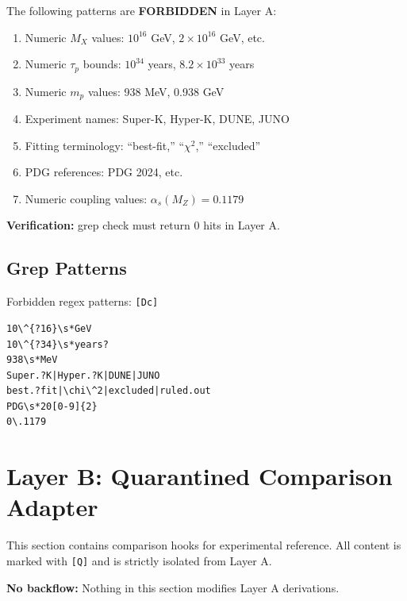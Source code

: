 \documentclass[11pt,a4paper]{article}
\newcommand{\tagDc}{\textcolor{blue!70!black}{\texttt{[Dc]}}}
\newcommand{\tagQ}{\textcolor{red!70!black}{\texttt{[Q]}}}
\theoremstyle{definition}
\begin{document}
\begin{forbiddenbox}
The following patterns are \textbf{FORBIDDEN} in Layer A:
\begin{enumerate}
  \item Numeric $M_X$ values: $10^{16}$ GeV, $2 \times 10^{16}$ GeV, etc.
  \item Numeric $\tau_p$ bounds: $10^{34}$ years, $8.2 \times 10^{33}$ years
  \item Numeric $m_p$ values: 938 MeV, 0.938 GeV
  \item Experiment names: Super-K, Hyper-K, DUNE, JUNO
  \item Fitting terminology: ``best-fit,'' ``$\chi^2$,'' ``excluded''
  \item PDG references: PDG 2024, etc.
  \item Numeric coupling values: $\alpha_s(M_Z) = 0.1179$
\end{enumerate}

\textbf{Verification:} grep check must return 0 hits in Layer A.
\end{forbiddenbox}

\subsection{Grep Patterns}
\label{subsec:grep-patterns}

Forbidden regex patterns: \tagDc{}
\begin{verbatim}
10\^{?16}\s*GeV
10\^{?34}\s*years?
938\s*MeV
Super.?K|Hyper.?K|DUNE|JUNO
best.?fit|\chi\^2|excluded|ruled.out
PDG\s*20[0-9]{2}
0\.1179
\end{verbatim}

\newpage
\section{Layer B: Quarantined Comparison Adapter}
\label{sec:layer-b}


\begin{quarantinebox}
This section contains comparison hooks for experimental reference.
All content is marked with \tagQ{} and is strictly isolated from Layer A.

\textbf{No backflow:} Nothing in this section modifies Layer A derivations.
\end{quarantinebox}
\end{document}
